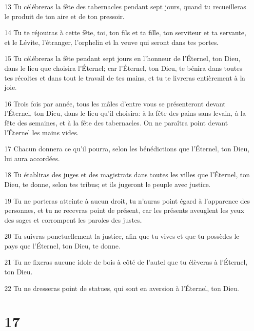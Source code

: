 \par 13 Tu célébreras la fête des tabernacles pendant sept jours, quand tu recueilleras le produit de ton aire et de ton pressoir.
\par 14 Tu te réjouiras à cette fête, toi, ton fils et ta fille, ton serviteur et ta servante, et le Lévite, l'étranger, l'orphelin et la veuve qui seront dans tes portes.
\par 15 Tu célébreras la fête pendant sept jours en l'honneur de l'Éternel, ton Dieu, dans le lieu que choisira l'Éternel; car l'Éternel, ton Dieu, te bénira dans toutes tes récoltes et dans tout le travail de tes mains, et tu te livreras entièrement à la joie.
\par 16 Trois fois par année, tous les mâles d'entre vous se présenteront devant l'Éternel, ton Dieu, dans le lieu qu'il choisira: à la fête des pains sans levain, à la fête des semaines, et à la fête des tabernacles. On ne paraîtra point devant l'Éternel les mains vides.
\par 17 Chacun donnera ce qu'il pourra, selon les bénédictions que l'Éternel, ton Dieu, lui aura accordées.
\par 18 Tu établiras des juges et des magistrats dans toutes les villes que l'Éternel, ton Dieu, te donne, selon tes tribus; et ils jugeront le peuple avec justice.
\par 19 Tu ne porteras atteinte à aucun droit, tu n'auras point égard à l'apparence des personnes, et tu ne recevras point de présent, car les présents aveuglent les yeux des sages et corrompent les paroles des justes.
\par 20 Tu suivras ponctuellement la justice, afin que tu vives et que tu possèdes le pays que l'Éternel, ton Dieu, te donne.
\par 21 Tu ne fixeras aucune idole de bois à côté de l'autel que tu élèveras à l'Éternel, ton Dieu.
\par 22 Tu ne dresseras point de statues, qui sont en aversion à l'Éternel, ton Dieu.

\chapter{17}


